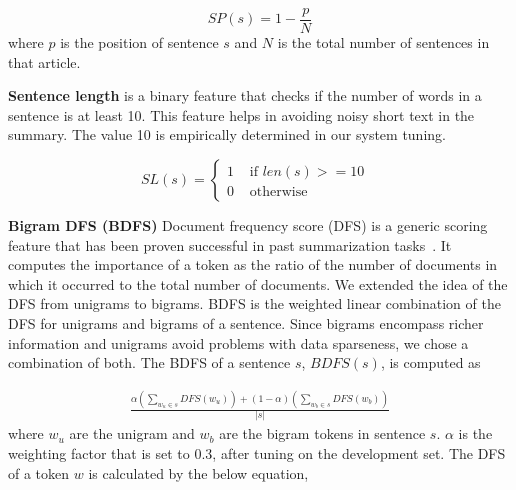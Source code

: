 \begin{displaymath}
SP(s) = 1 - \frac{p}{N}
\end{displaymath}
where $p$ is the position of sentence $s$ and $N$ is the total number of sentences in that article.

\textbf{Sentence length} is a binary feature that checks if the number of words in a sentence is at least 10. This feature helps in avoiding noisy short text in the summary. The value 10 is empirically determined in our system tuning.

\begin{equation*}
SL(s) = \left\{
\begin{array}{rl}
1 &\mbox{ if $len(s) >= 10$ } \\
0 &\mbox{ otherwise }
\end{array}
\right.
\end{equation*}

\textbf{Bigram DFS (BDFS)} Document frequency score (DFS) is a  generic scoring feature that has been proven successful in past summarization tasks~\cite{ICON_2009,Schilder-Kondadadi-08}. It computes the importance of a 
token as the ratio of the number of documents in which it occurred to the total number of documents. We extended the idea of the DFS from unigrams to bigrams. BDFS is the weighted linear combination of the DFS for unigrams and bigrams of a sentence. Since bigrams encompass richer information and unigrams avoid problems with data sparseness, we chose a combination of both. The BDFS of a sentence $s$, $BDFS(s)$, is computed as

\begin{eqnarray*}
\frac{\alpha(\sum_{w_{u} \in s} DFS(w_{u})) + (1-\alpha) (\sum_{w_{b} \in s} DFS(w_{b}))}{|s|} 
\end{eqnarray*}
where $w_{u}$ are the unigram and $w_b$ are the bigram tokens in sentence $s$. $\alpha$ is the weighting factor that is set to 0.3, after tuning on the development set. The DFS of a token $w$ is calculated by the below equation,

